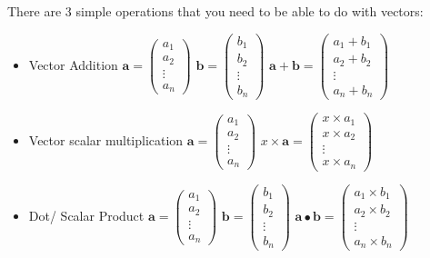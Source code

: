   There are 3 simple operations that you need to be able to do with vectors:
  \begin{itemize}
  	\item Vector Addition
	  	\subitem $\textbf{a} = \left( \begin{smallmatrix} a_1 \\ a_2 \\ \vdots \\ a_n \end{smallmatrix}\right)$
	  	\subitem $\textbf{b} = \left( \begin{smallmatrix} b_1 \\ b_2 \\ \vdots \\ b_n\end{smallmatrix}\right)$
	  	\subitem $\textbf{a} + \textbf{b} = \left( \begin{smallmatrix} a_1+b_1 \\ a_2+b_2 \\ \vdots \\ a_n+b_n\end{smallmatrix}\right)$
  	\item Vector scalar multiplication
	  	\subitem $\textbf{a} = \left( \begin{smallmatrix} a_1 \\ a_2 \\ \vdots \\ a_n \end{smallmatrix}\right)$
	  	\subitem $x \times \textbf{a} = \left( \begin{smallmatrix} x \times a_1 \\ x \times a_2 \\ \vdots \\ x \times a_n\end{smallmatrix}\right)$
  	\item Dot/ Scalar Product
	  	\subitem $\textbf{a} = \left( \begin{smallmatrix} a_1 \\ a_2 \\ \vdots \\ a_n \end{smallmatrix}\right)$
	  	\subitem $\textbf{b} = \left( \begin{smallmatrix} b_1 \\ b_2 \\ \vdots \\ b_n\end{smallmatrix}\right)$
	  	\subitem $\textbf{a} \bullet \textbf{b} = \left( \begin{smallmatrix} a_1 \times b_1 \\ a_2 \times b_2 \\ \vdots \\ a_n \times b_n\end{smallmatrix}\right)$
  \end{itemize}

